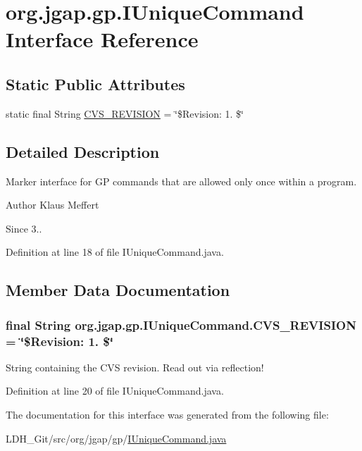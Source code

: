 \hypertarget{interfaceorg_1_1jgap_1_1gp_1_1_i_unique_command}{\section{org.\-jgap.\-gp.\-I\-Unique\-Command Interface Reference}
\label{interfaceorg_1_1jgap_1_1gp_1_1_i_unique_command}
}
\subsection*{Static Public Attributes}
\begin{DoxyCompactItemize}
\item 
static final String \hyperlink{interfaceorg_1_1jgap_1_1gp_1_1_i_unique_command_a2ed1d3c9d7127fc447707fc324265d30}{C\-V\-S\-\_\-\-R\-E\-V\-I\-S\-I\-O\-N} = \char`\"{}\$Revision\-: 1. \$\char`\"{}
\end{DoxyCompactItemize}


\subsection{Detailed Description}
Marker interface for G\-P commands that are allowed only once within a program.

\begin{DoxyAuthor}{Author}
Klaus Meffert 
\end{DoxyAuthor}
\begin{DoxySince}{Since}
3.. 
\end{DoxySince}


Definition at line 18 of file I\-Unique\-Command.\-java.



\subsection{Member Data Documentation}
\hypertarget{interfaceorg_1_1jgap_1_1gp_1_1_i_unique_command_a2ed1d3c9d7127fc447707fc324265d30}{
\subsubsection[{C\-V\-S\-\_\-\-R\-E\-V\-I\-S\-I\-O\-N}]{\setlength{\rightskip}{0pt plus 5cm}final String org.\-jgap.\-gp.\-I\-Unique\-Command.\-C\-V\-S\-\_\-\-R\-E\-V\-I\-S\-I\-O\-N = \char`\"{}\$Revision\-: 1. \$\char`\"{}\hspace{0.3cm}{\ttfamily [static]}}}\label{interfaceorg_1_1jgap_1_1gp_1_1_i_unique_command_a2ed1d3c9d7127fc447707fc324265d30}
String containing the C\-V\-S revision. Read out via reflection! 

Definition at line 20 of file I\-Unique\-Command.\-java.



The documentation for this interface was generated from the following file\-:\begin{DoxyCompactItemize}
\item 
L\-D\-H\-\_\-\-Git/src/org/jgap/gp/\hyperlink{_i_unique_command_8java}{I\-Unique\-Command.\-java}\end{DoxyCompactItemize}
